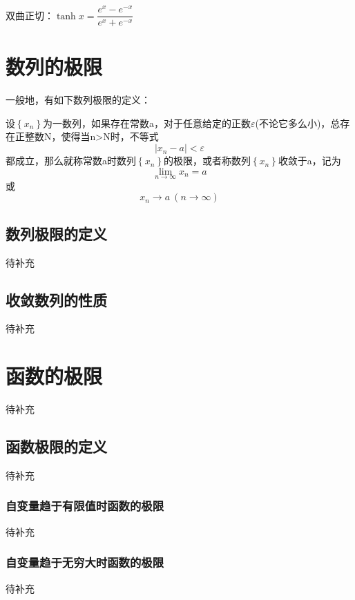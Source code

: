 双曲正切：$ \tanh x = \dfrac{e^x - e^{-x}}{e^x + e^{-x}} $

\section{数列的极限}

一般地，有如下数列极限的定义：
\begin{definition}
	设$ \left\lbrace x_n \right\rbrace  $为一数列，如果存在常数a，对于任意给定的正数$ \varepsilon $(不论它多么小)，总存在正整数N，使得当n>N时，不等式
	\begin{equation}
		\lvert x_n - a \rvert < \varepsilon
	\end{equation}
	都成立，那么就称常数a时数列$ \left\lbrace x_n \right\rbrace  $的极限，或者称数列$ \left\lbrace x_n \right\rbrace  $收敛于a，记为
	\begin{equation}
		\lim_{n \to \infty} x_n = a
	\end{equation}
	或
	\begin{equation}
		x_n \to a \  (n \to \infty)
	\end{equation}
\end{definition}


\subsection{数列极限的定义}

待补充

\subsection{收敛数列的性质}

待补充

\section{函数的极限}
待补充

\subsection{函数极限的定义}
待补充

\subsubsection{自变量趋于有限值时函数的极限}
待补充

\subsubsection{自变量趋于无穷大时函数的极限}
待补充

